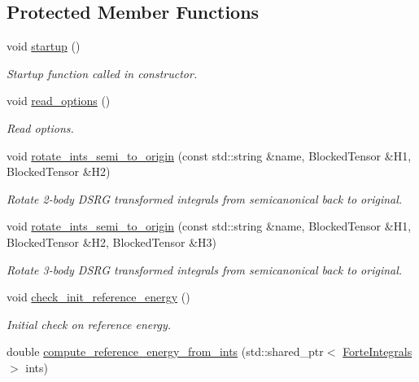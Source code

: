 \subsection*{Protected Member Functions}
\begin{DoxyCompactItemize}
\item 
void \mbox{\hyperlink{classforte_1_1_m_a_s_t_e_r___d_s_r_g_a163847289aaa28024bcb0fb3ccccd0fc}{startup}} ()
\begin{DoxyCompactList}\small\item\em Startup function called in constructor. \end{DoxyCompactList}\item 
void \mbox{\hyperlink{classforte_1_1_m_a_s_t_e_r___d_s_r_g_ae27719b9d4626150013d5aa6aa6290e7}{read\+\_\+options}} ()
\begin{DoxyCompactList}\small\item\em Read options. \end{DoxyCompactList}\item 
void \mbox{\hyperlink{classforte_1_1_m_a_s_t_e_r___d_s_r_g_a7b863c8d3f36ac7f02f14456be7f2df3}{rotate\+\_\+ints\+\_\+semi\+\_\+to\+\_\+origin}} (const std\+::string \&name, Blocked\+Tensor \&H1, Blocked\+Tensor \&H2)
\begin{DoxyCompactList}\small\item\em Rotate 2-\/body D\+S\+RG transformed integrals from semicanonical back to original. \end{DoxyCompactList}\item 
void \mbox{\hyperlink{classforte_1_1_m_a_s_t_e_r___d_s_r_g_a9a447e4bfb4cd2187b7f1d02cd6713fd}{rotate\+\_\+ints\+\_\+semi\+\_\+to\+\_\+origin}} (const std\+::string \&name, Blocked\+Tensor \&H1, Blocked\+Tensor \&H2, Blocked\+Tensor \&H3)
\begin{DoxyCompactList}\small\item\em Rotate 3-\/body D\+S\+RG transformed integrals from semicanonical back to original. \end{DoxyCompactList}\item 
void \mbox{\hyperlink{classforte_1_1_m_a_s_t_e_r___d_s_r_g_a89d478d95c345bedd8b1e4a3862f644a}{check\+\_\+init\+\_\+reference\+\_\+energy}} ()
\begin{DoxyCompactList}\small\item\em Initial check on reference energy. \end{DoxyCompactList}\item 
double \mbox{\hyperlink{classforte_1_1_m_a_s_t_e_r___d_s_r_g_a2dd2a66d680e50beb52cb3651f1f994d}{compute\+\_\+reference\+\_\+energy\+\_\+from\+\_\+ints}} (std\+::shared\+\_\+ptr$<$ \mbox{\hyperlink{classforte_1_1_forte_integrals}{Forte\+Integrals}} $>$ ints)

\end{DoxyCompactItemize}
